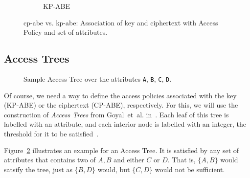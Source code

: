 \begin{figure}
\begin{subfigure}[t]{0.4\textwidth}
        \caption{KP-ABE}
    \end{subfigure}
    \caption[\acrshort{cp-abe} vs. \acrshort{kp-abe}]{\acrshort{cp-abe} vs. \acrshort{kp-abe}: Association of key and ciphertext with Access Policy and set of attributes.}
    \label{fig:cp-kp-abe}
\end{figure}

\subsection{Access Trees}

\begin{figure}
    \centering
    \caption[Sample Access Tree]{
        Sample Access Tree over the attributes \texttt{A}, \texttt{B}, \texttt{C}, \texttt{D}.
    }
    \label{fig:sample-access-tree}
\end{figure}
Of course, we need a way to define the access policies associated with the key (KP-ABE) or the ciphertext (CP-ABE), respectively.
For this, we will use the construction of \emph{Access Trees} from Goyal~et~al. in~\cite{goyal_attribute-based_2006}.
Each leaf of this tree is labelled with an attribute, and each interior node is labelled with an integer, the threshold for it to be satisfied~\cite{goyal_attribute-based_2006}.

Figure~\ref{fig:sample-access-tree} illustrates an example for an Access Tree. It is satisfied by any set of attributes that contains two of $A, B$ and either $C$ or $D$.
That is, $\{A,B\}$ would satsify the tree, just as $\{B, D\}$ would, but $\{C, D\}$ would not be sufficient.

